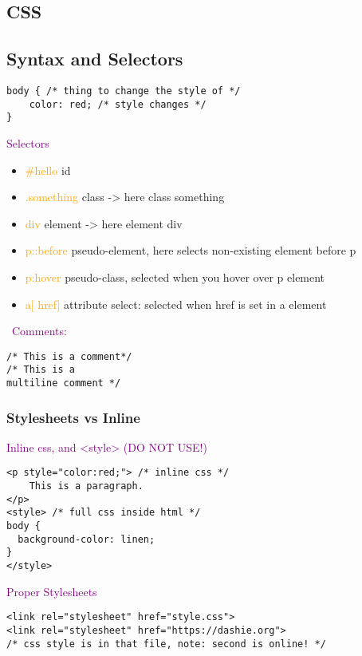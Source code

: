 \documentclass[main.tex,fontsize=6pt,paper=a4,paper=landscape,DIV=calc,]{scrartcl}
\begin{document}
\begin{multicols*}{4}
\section{CSS}
\subsection{Syntax and Selectors}
\vspace{-2mm}
\begin{lstlisting}
body { /* thing to change the style of */ 
    color: red; /* style changes */
}
\end{lstlisting}
\vspace{2mm}
\textcolor{purple}{Selectors}
\begin{itemize}
\item \textcolor{orange}{\#hello} id
\item \textcolor{orange}{.something} class -> here class something
\item \textcolor{orange}{div} element -> here element div
\item \textcolor{orange}{p::before} pseudo-element, here selects non-existing element before p
\item \textcolor{orange}{p:hover} pseudo-class, selected when you hover over p element
\item \textcolor{orange}{a[ href]} attribute select: selected when href is set in a element
\end{itemize} 
\, \newline
\textcolor{purple}{Comments:}
\vspace{-2mm}
\begin{lstlisting}
/* This is a comment*/ 
/* This is a 
multiline comment */
\end{lstlisting}
\vspace{2mm}

\subsubsection{Stylesheets vs Inline}
\textcolor{purple}{Inline css, and <style> (DO NOT USE!)}
\vspace{-2mm}
\begin{lstlisting}
<p style="color:red;"> /* inline css */
    This is a paragraph.
</p>
<style> /* full css inside html */
body {
  background-color: linen;
}
</style>
\end{lstlisting}
\vspace{2mm}

\textcolor{purple}{Proper Stylesheets}
\vspace{-2mm}
\begin{lstlisting}
<link rel="stylesheet" href="style.css">
<link rel="stylesheet" href="https://dashie.org"> 
/* css style is in that file, note: second is online! */ 
\end{lstlisting}
\vspace{2mm}


\end{multicols*}
\end{document}
